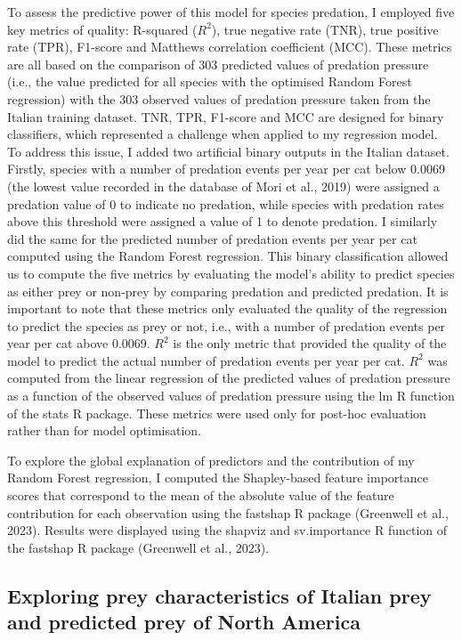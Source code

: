\documentclass[
  super,
  review,
  3p]{elsarticle}
\begin{document}
To assess the predictive power of this model for species predation, I
employed five key metrics of quality: R-squared (\(R^{2}\)), true
negative rate (TNR), true positive rate (TPR), F1-score and Matthews
correlation coefficient (MCC). These metrics are all based on the
comparison of 303 predicted values of predation pressure (i.e., the
value predicted for all species with the optimised Random Forest
regression) with the 303 observed values of predation pressure taken
from the Italian training dataset. TNR, TPR, F1-score and MCC are
designed for binary classifiers, which represented a challenge when
applied to my regression model. To address this issue, I added two
artificial binary outputs in the Italian dataset. Firstly, species with
a number of predation events per year per cat below 0.0069 (the lowest
value recorded in the database of Mori et al., 2019) were assigned a
predation value of 0 to indicate no predation, while species with
predation rates above this threshold were assigned a value of 1 to
denote predation. I similarly did the same for the predicted number of
predation events per year per cat computed using the Random Forest
regression. This binary classification allowed us to compute the five
metrics by evaluating the model's ability to predict species as either
prey or non-prey by comparing predation and predicted predation. It is
important to note that these metrics only evaluated the quality of the
regression to predict the species as prey or not, i.e., with a number of
predation events per year per cat above 0.0069. \(R^{2}\) is the only
metric that provided the quality of the model to predict the actual
number of predation events per year per cat. \(R^{2}\) was computed from
the linear regression of the predicted values of predation pressure as a
function of the observed values of predation pressure using the lm R
function of the stats R package. These metrics were used only for
post-hoc evaluation rather than for model optimisation.

To explore the global explanation of predictors and the contribution of
my Random Forest regression, I computed the Shapley-based feature
importance scores that correspond to the mean of the absolute value of
the feature contribution for each observation using the fastshap R
package (Greenwell et al., 2023). Results were displayed using the
shapviz and sv.importance R function of the fastshap R package
(Greenwell et al., 2023).

\hypertarget{exploring-prey-characteristics-of-italian-prey-and-predicted-prey-of-north-america}{%
\subsection{Exploring prey characteristics of Italian prey and predicted
prey of North
America}\label{exploring-prey-characteristics-of-italian-prey-and-predicted-prey-of-north-america}}
\end{document}
